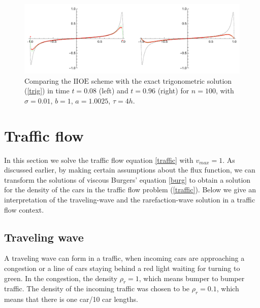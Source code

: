 \documentclass[../include.tex]{subfiles}
\begin{document}
\begin{figure}[h!] 
	\centering
	\includegraphics[width=\textwidth]{figures/trig100}
	\caption{Comparing the $\mathrm{IIOE}$ scheme with the exact trigonometric solution {\rm (\ref{trig})} in time $ t = 0.08 $ (left) and $ t = 0.96 $ (right) for $ n=100 $, with $ \sigma=0.01 $, $ b=1 $, $ a=1.0025 $, $ \tau = 4h $.}
	\label{ftrig} 
\end{figure} 

\newpage
\section{Traffic flow}
In this section we solve the traffic flow equation \eqref{traffic} with $ v_{max} = 1 $.
As discussed earlier, by making certain assumptions about the flux function, we can transform the solutions of viscous Burgers' equation \eqref{burg} to obtain a solution for the density of the cars in the traffic flow problem (\ref{traffic}). Below we give an interpretation of the traveling-wave and the rarefaction-wave solution in a traffic flow context.

\subsection{Traveling wave}
A traveling wave can form in a traffic, when incoming cars are approaching a congestion or a line of cars staying behind a red light waiting for turning to green. In the congestion, the density $ \rho_r = 1 $, which means bumper to bumper traffic. The density of the incoming traffic was chosen to be $ \rho_r = 0.1 $, which means that there is one car/10 car lengths.
\end{document}
